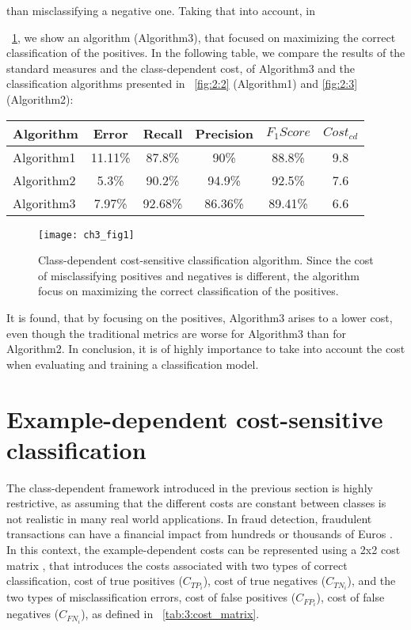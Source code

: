than misclassifying a negative one. Taking that into account, in \figurename{~\ref{fig:3:1}, we show 
an algorithm (Algorithm3), that focused on maximizing the correct classification of the positives.
In the following table, we compare the results of the standard measures and the class-dependent 
cost, of Algorithm3 and the classification algorithms presented in \figurename{~\ref{fig:2:2}} 
(Algorithm1) and \figurename{ \ref{fig:2:3}} (Algorithm2):
\begin{center}
    \footnotesize
  \begin{tabular}{l|c|c|c|c|c}
  Algorithm & Error & Recall & Precision & $F_1Score$ & $Cost_{cd}$ \\
  \hline
  Algorithm1 & 11.11\% & 87.8\%& 90\%& 88.8\% & 9.8\\ %
  Algorithm2 & 5.3\% & 90.2\%& 94.9\%& 92.5\% & 7.6\\ %
  Algorithm3 & 7.97\%& 92.68\% &86.36\%& 89.41\% & 6.6 \\
  \end{tabular}
\end{center}
\vspace{0.3cm}

\begin{figure}[t!]
  \centering
  \texttt{[image: ch3\_fig1]}
  \caption{Class-dependent cost-sensitive classification algorithm. Since the cost of misclassifying 
positives and negatives is different, the algorithm focus on maximizing the correct classification 
of the positives.}
  \label{fig:3:1}
\end{figure}

It is found, that by focusing on the positives, Algorithm3 arises to a lower cost, even though the 
traditional metrics are worse for Algorithm3 than for Algorithm2. In conclusion, it is of highly 
importance to take into account the cost when evaluating and training a classification model.


\section{Example-dependent cost-sensitive classification}
\label{sec:3:example-dependent}

The class-dependent framework introduced in the previous section is highly restrictive, as 
assuming that the different costs are constant between classes is not realistic in many real world 
applications. In fraud detection, fraudulent transactions  can have a financial impact from 
hundreds or thousands of Euros \cite{Sahin2013}. 
In this context, the example-dependent costs can be represented using a 2x2 cost matrix 
\citep{Elkan2001}, that introduces the costs associated with   two types of correct   
classification, cost of true positives ($C_{TP_i}$), cost of true negatives ($C_{TN_i}$),   and the 
two  types of   misclassification errors, cost of false positives ($C_{FP_i}$), cost of false 
negatives   ($C_{FN_i}$), as   defined in \tablename{~\ref{tab:3:cost_matrix}}.

}
